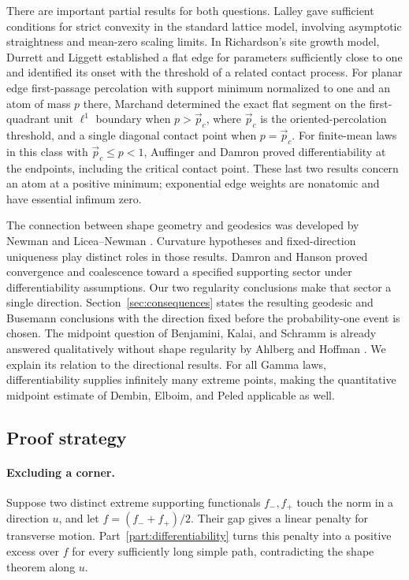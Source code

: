 There are important partial results for both questions. Lalley
\cite{Lalley2003} gave sufficient conditions for strict convexity in
the standard lattice model, involving asymptotic straightness and
mean-zero scaling limits. In Richardson's site growth model, Durrett
and Liggett \cite{DurrettLiggett1981} established a flat edge for
parameters sufficiently close to one and identified its onset with the
threshold of a related contact process. For planar edge first-passage
percolation with support minimum normalized to one and an atom of mass $p$
there, Marchand \cite[Theorem~1.3]{Marchand2002} determined the exact
flat segment on the first-quadrant unit $\ell^1$ boundary when
$p>\vec p_c$, where $\vec p_c$ is the oriented-percolation threshold,
and a single diagonal contact point when $p=\vec p_c$. For finite-mean
laws in this class with $\vec p_c\le p<1$, Auffinger and Damron
\cite[Theorem~2.1]{AD13} proved differentiability at the endpoints,
including the critical contact point. These last two results concern
an atom at a positive minimum; exponential edge weights are nonatomic
and have essential infimum zero.

The connection between shape geometry and geodesics was developed by
Newman and Licea--Newman \cite{Newman1995,LiceaNewman1996}. Curvature
hypotheses and fixed-direction uniqueness play distinct roles in those
results. Damron and Hanson \cite{DH2017}
proved convergence and coalescence toward a specified supporting sector
under differentiability assumptions. Our two regularity conclusions
make that sector a single direction. Section~\ref{sec:consequences}
states the resulting geodesic and Busemann conclusions with the
direction fixed before the probability-one event is chosen. The
midpoint question of Benjamini, Kalai, and Schramm \cite{BKS2003}
is already answered qualitatively without shape regularity by Ahlberg
and Hoffman \cite{AH2019}. We explain its relation to the directional
results. For all Gamma laws, differentiability supplies infinitely
many extreme points, making the quantitative midpoint estimate of
Dembin, Elboim, and Peled \cite{DEP2024} applicable as well.

\subsection{Proof strategy}

\paragraph{Excluding a corner.}
Suppose two distinct extreme supporting functionals $f_-,f_+$ touch
the norm in a direction $u$, and let $f=(f_-+f_+)/2$. Their gap gives
a linear penalty for transverse motion. Part~\ref{part:differentiability}
turns this penalty into a positive excess over $f$ for every sufficiently
long simple path, contradicting the shape theorem along $u$.

